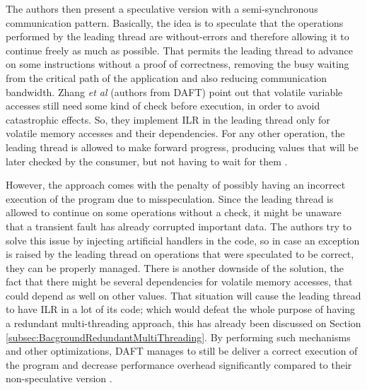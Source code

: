 The authors then present a speculative version with a semi-synchronous communication pattern. Basically, the idea is to speculate that the operations performed by the leading thread are without-errors and therefore allowing it to continue freely as much as possible. That permits the leading thread to advance on some instructions without a proof of correctness, removing the busy waiting from the critical path of the application and also reducing communication bandwidth. Zhang \textit{et al} (authors from DAFT) point out that volatile variable accesses still need some kind of check before execution, in order to avoid catastrophic effects. So, they implement ILR in the leading thread only for volatile memory accesses and their dependencies. For any other operation, the leading thread is allowed to make forward progress, producing values that will be later checked by the consumer, but not having to wait for them \cite{zhang2012daft}.  

However, the approach comes with the penalty of possibly having an incorrect execution of the program due to misspeculation. Since the leading thread is allowed to continue on some operations without a check, it might be unaware that a transient fault has already corrupted important data. The authors try to solve this issue by injecting artificial handlers in the code, so in case an exception is raised by the leading thread on operations that were speculated to be correct, they can be properly managed. There is another downside of the solution, the fact that there might be several dependencies for volatile memory accesses, that could depend as well on other values. That situation will  cause the leading thread to have ILR in a lot of its code; which would defeat the whole purpose of having a redundant multi-threading approach, this has already been discussed on Section \ref{subsec:BacgroundRedundantMultiThreading}. By performing such mechanisms and other optimizations, DAFT manages to still be deliver a correct execution of the program and decrease performance overhead significantly compared to their non-speculative version \cite{zhang2012daft}. 


